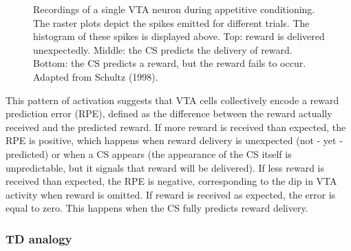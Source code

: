 \documentclass[
  11pt,
  a4paper,
]{scrbook}
\begin{document}
\begin{figure}


\caption{\label{fig-intro:daschultz}Recordings of a single VTA neuron
during appetitive conditioning. The raster plots depict the spikes
emitted for different trials. The histogram of these spikes is displayed
above. Top: reward is delivered unexpectedly. Middle: the CS predicts
the delivery of reward. Bottom: the CS predicts a reward, but the reward
fails to occur. Adapted from Schultz (1998).}

\end{figure}%

This pattern of activation suggests that VTA cells collectively encode a
reward prediction error (RPE), defined as the difference between the
reward actually received and the predicted reward. If more reward is
received than expected, the RPE is positive, which happens when reward
delivery is unexpected (not - yet - predicted) or when a CS appears (the
appearance of the CS itself is unpredictable, but it signals that reward
will be delivered). If less reward is received than expected, the RPE is
negative, corresponding to the dip in VTA activity when reward is
omitted. If reward is received as expected, the error is equal to zero.
This happens when the CS fully predicts reward delivery.

\subsubsection*{TD analogy}\label{td-analogy}
\end{document}
